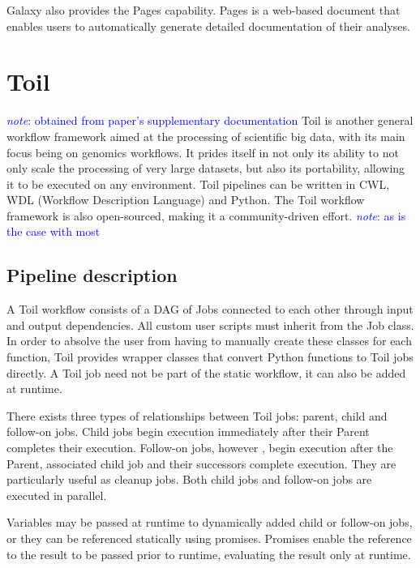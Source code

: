 \documentclass{report}
\newcommand{\note}[1]{\textcolor{blue}{\textit{note}: #1}}
\begin{document}
        Galaxy also provides the Pages capability. Pages is a web-based document
        that enables users to automatically generate detailed documentation of 
        their analyses.

    \section{Toil}
        \note{obtained from paper's supplementary documentation}
        Toil is another general workflow framework aimed at the processing of 
        scientific big data, with its main focus being on genomics workflows. It 
        prides itself in not only its ability to not only scale the processing 
        of very large datasets, but also its portability, allowing it to be 
        executed on any environment. Toil pipelines can be written in CWL, WDL 
        (Workflow Description Language) and Python. The Toil workflow 
        framework is also open-sourced, making it a community-driven effort. 
        \note{as is the case with most} 

        \subsection{Pipeline description}
           A Toil workflow consists of a DAG of Jobs connected to each other
           through input and output dependencies. All custom user scripts must
           inherit from the Job class. In order to absolve the user from having
           to manually create these classes for each function, Toil provides
           wrapper classes that convert Python functions to Toil jobs directly.
           A Toil job need not be part of the static workflow, it can also be
           added at runtime.

           There exists three types of relationships between Toil jobs: parent, 
           child and follow-on jobs. Child jobs begin execution immediately
           after their Parent completes their execution. Follow-on jobs, however
           , begin execution after the Parent, associated child job and their
           successors complete execution. They are particularly useful as 
           cleanup jobs. Both child jobs and follow-on jobs are executed in
           parallel.

           Variables may be passed at runtime to dynamically added child or
           follow-on jobs, or they can be referenced statically using promises.
           Promises enable the reference to the result to be passed prior to 
           runtime, evaluating the result only at runtime.
\end{document}
